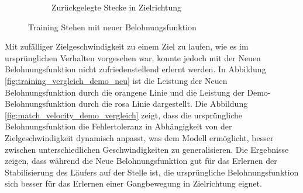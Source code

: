 \begin{figure}[H]
\begin{subfigure}{.49\textwidth}
      \caption{Zurückgelegte Stecke in Zielrichtung}
      \label{fig:126_move_target_dir}
    \end{subfigure}
  \caption{Training Stehen mit neuer Belohnungsfunktion}
  \label{fig:training_stehen_neu}
\end{figure}

Mit zufälliger Zielgeschwindigkeit zu einem Ziel zu laufen, wie es im ursprünglichen Verhalten vorgesehen war, konnte jedoch mit der Neuen Belohnungsfunktion nicht zufriedenstellend erlernt werden. In Abbildung \ref{fig:training_vergleich_demo_neu} ist die Leistung der Neuen Belohnungsfunktion durch die orangene Linie und die Leistung der Demo-Belohnungsfunktion durch die rosa Linie dargestellt. Die Abbildung \ref{fig:match_velocity_demo_vergleich} zeigt, dass die ursprüngliche Belohnungsfunktion die Fehlertoleranz in Abhängigkeit von der Zielgeschwindigkeit dynamisch anpasst, was dem Modell ermöglicht, besser zwischen unterschiedlichen Geschwindigkeiten zu generalisieren. Die Ergebnisse zeigen, dass während die Neue Belohnungsfunktion gut für das Erlernen der Stabilisierung des Läufers auf der Stelle ist, die ursprüngliche Belohnungsfunktion sich besser für das Erlernen einer Gangbewegung in Zielrichtung eignet.

